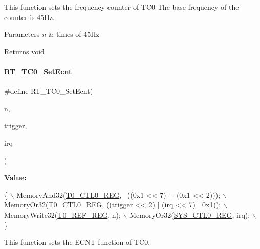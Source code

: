 This function sets the frequency counter of T\+C0 The base frequency of the counter is 45\+Hz. 


\begin{DoxyParams}{Parameters}
{\em n} & times of 45\+Hz \\
\hline
\end{DoxyParams}
\begin{DoxyReturn}{Returns}
void 
\end{DoxyReturn}
\mbox{\label{a00041_a2739dbdedbc45242d873c9ecd9f5f56a}} 
\paragraph{\texorpdfstring{R\+T\+\_\+\+T\+C0\+\_\+\+Set\+Ecnt}{RT\_TC0\_SetEcnt}}
{\footnotesize\ttfamily \#define R\+T\+\_\+\+T\+C0\+\_\+\+Set\+Ecnt(\begin{DoxyParamCaption}\item[{}]{n,  }\item[{}]{trigger,  }\item[{}]{irq }\end{DoxyParamCaption})}

{\bfseries Value\+:}
\begin{DoxyCode}
\{                                                                 \(\backslash\)
        MemoryAnd32(\mbox{\hyperlink{a00020_adadaa0ab1ebbd7ba9b70dfd24c3ed44da869abf9d87f78f45a0e07ad352abb39e}{T0\_CTL0\_REG}}, ~((0x1 << 7) + (0x1 << 2)));         \(\backslash\)
        MemoryOr32(\mbox{\hyperlink{a00020_adadaa0ab1ebbd7ba9b70dfd24c3ed44da869abf9d87f78f45a0e07ad352abb39e}{T0\_CTL0\_REG}}, ((trigger << 2) | (irq << 7) | 0x1)); \(\backslash\)
        MemoryWrite32(\mbox{\hyperlink{a00020_adadaa0ab1ebbd7ba9b70dfd24c3ed44da7b512fe986ef45d3f84daa6bf6733200}{T0\_REF\_REG}}, n);                                 \(\backslash\)
        MemoryOr32(\mbox{\hyperlink{a00020_adadaa0ab1ebbd7ba9b70dfd24c3ed44dab61d9968d782d6c00e9de838e38913f5}{SYS\_CTL0\_REG}}, irq);                                \(\backslash\)
    \}
\end{DoxyCode}


This function sets the E\+C\+NT function of T\+C0. 


